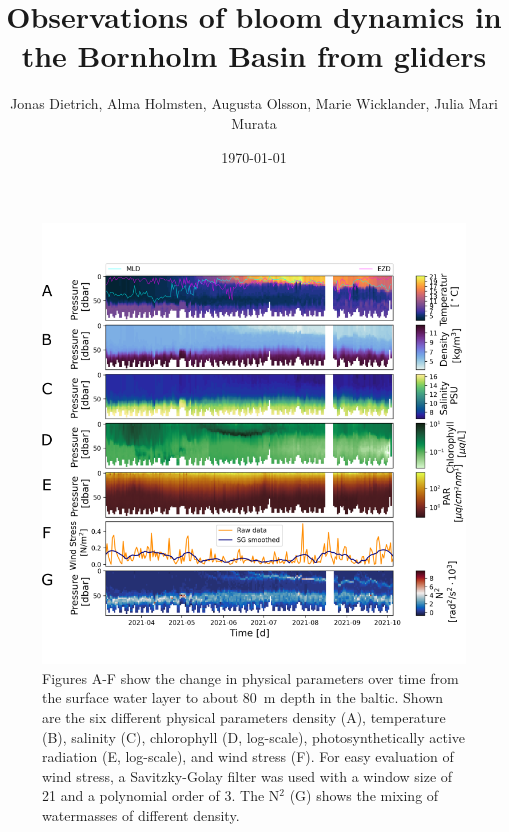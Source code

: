 \documentclass{article}
\title{Observations of bloom dynamics in the Bornholm Basin from gliders}
\author{Jonas Dietrich, Alma Holmsten, Augusta Olsson, Marie Wicklander, Julia Mari Murata}
\date{\today}
\begin{document}
\maketitle



\begin{multicols}{2}



\end{multicols}

\begin{figure}[H]
  \centering
    \includegraphics[width=\textwidth]{All_Properties.png}
\caption{Figures A-F show the change in physical parameters over time from the surface water layer to about \SI{80}{m} depth in the baltic. 
Shown are the six different physical parameters density (A), temperature (B), salinity (C), chlorophyll (D, log-scale), photosynthetically active radiation (E, log-scale), and wind stress (F). For easy evaluation of wind stress, a Savitzky-Golay filter was used with a window size of 21 and a polynomial order of 3. The N$^2$ (G) shows the mixing of watermasses of different density.}
  \label{fig:all}
\end{figure}

\begin{multicols}{2}


\printbibliography
\end{multicols}


%
\end{document}

